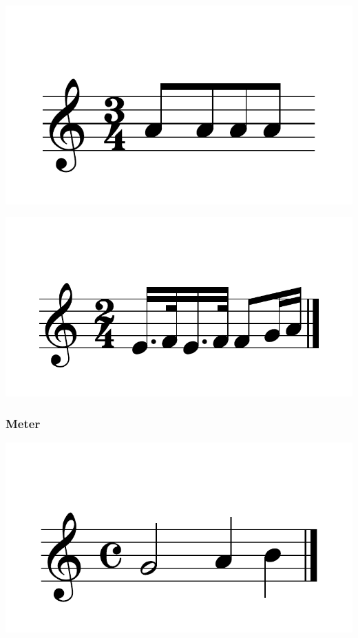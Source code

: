 \documentclass{article}
\begin{document}
\includegraphics[scale=0.5]{figures_tests/pdf/skern/beaming2.pdf}

\includegraphics[scale=0.5]{figures_tests/pdf/skern/partialbeaming0.pdf}


\subsubsection{Meter}
\includegraphics[scale=0.5]{figures_tests/pdf/skern/commonmeter1.pdf}
\end{document}
